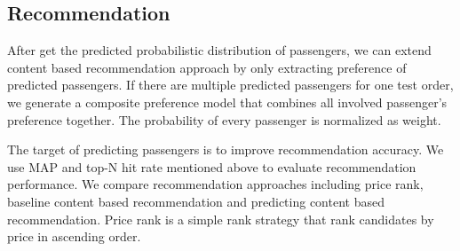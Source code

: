 \documentclass{sig-alternate-05-2015}
\begin{document}
\subsection{Recommendation}
After get the predicted probabilistic distribution of passengers, we can extend content based recommendation approach by only extracting preference of predicted passengers. If there are multiple predicted passengers for one test order, we generate a composite preference model that combines all involved passenger's preference together. The probability of every passenger is normalized as weight.\par
The target of predicting passengers is to improve recommendation accuracy. We use MAP and top-N hit rate mentioned above to evaluate recommendation performance. We compare recommendation approaches including price rank, baseline content based recommendation and predicting content based recommendation. Price rank is a simple rank strategy that rank candidates by price in ascending order.\par
\end{document}
